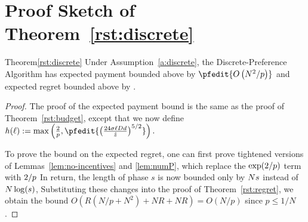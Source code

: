 \section{Proof Sketch of Theorem~\ref{rst:discrete}}
\label{sec:discussion-proof1}

\begin{rtheorem}{Theorem}{\ref{rst:discrete}}
Under Assumption~\ref{a:discrete}, the Discrete-Preference Algorithm has expected payment  bounded above by 
$\pfedit{O \left(\ARMNUM^2 /p \right)}$
and expected regret bounded above by .
\end{rtheorem}

\begin{proof}
The proof of the expected payment bound is the same as the proof of Theorem~\ref{rst:budget}, except that we now define $h(\ell) := \max \left( \frac{2}{\MinProb},
\pfedit{
\left( \frac{24 \sigma \ell \Diam d}{\TieCutoff} \right)^{5/2}
}
\right).
$

To prove the bound on the expected regret, one can first prove tightened versions of Lemmas~\ref{lem:no-incentives} and \ref{lem:numP},
which replace the $\exp(2/p)$ term with  $2/p$ 
In return, the length of phase $s$ is now bounded only by $N s$ instead of $N \log(s)$, 
Substituting these changes into the proof of Theorem~\ref{rst:regret}, we obtain the bound $O(R(N/p + N^2) + NR + NR) = O(N/p)$ since $p \le 1/N$.




\end{proof}

